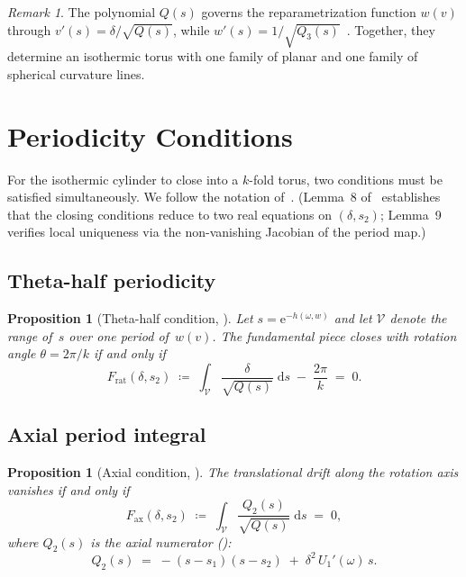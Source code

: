 \documentclass[11pt,a4paper]{article}
\theoremstyle{plain}
\newtheorem{proposition}[theorem]{Proposition}
\theoremstyle{definition}
\theoremstyle{remark}
\newtheorem{remark}[theorem]{Remark}
\newcommand{\dd}{\mathrm{d}}
\newcommand{\ee}{\mathrm{e}}
\begin{document}
\begin{remark}
  The polynomial $Q(s)$ governs the reparametrization function
  $w(v)$ through $v'(s) = \delta/\sqrt{Q(s)}$, while
  $w'(s) = 1/\sqrt{Q_3(s)}$~\cite[Corollary~6]{BHS-comp}.
  Together, they determine an isothermic torus with one family of
  planar and one family of spherical curvature lines.
\end{remark}


\section{Periodicity Conditions}\label{sec:periodicity}

For the isothermic cylinder to close into a $k$-fold torus, two
conditions must be satisfied simultaneously.  We follow the notation
of~\cite[Section~5.3]{BHS-comp}.
(Lemma~8 of~\cite{BHS-comp} establishes that the closing conditions
reduce to two real equations on $(\delta, s_2)$;
Lemma~9 verifies local uniqueness via the non-vanishing
Jacobian of the period map.)

\subsection{Theta-half periodicity}\label{sec:theta-half}

\begin{proposition}[Theta-half condition,
  {\cite[Eq.~82]{BHS-comp}}]
\label{prop:theta-half}
Let $s = \ee^{-h(\omega,w)}$ and let $\mathcal{V}$ denote the range
of~$s$ over one period of~$w(v)$.  The fundamental piece closes with
rotation angle $\theta = 2\pi/k$ if and only if
\begin{equation}
  F_{\mathrm{rat}}(\delta,s_2)
  \;\coloneqq\;
  \int_{\mathcal{V}} \frac{\delta}{\sqrt{Q(s)}} \;\dd s
  \;-\; \frac{2\pi}{k}
  \;=\; 0.
  \label{eq:F-rat}
\end{equation}
\end{proposition}

\subsection{Axial period integral}\label{sec:axial}

\begin{proposition}[Axial condition,
  {\cite[Eq.~83]{BHS-comp}}]
\label{prop:axial}
The translational drift along the rotation axis vanishes if and only if
\begin{equation}
  F_{\mathrm{ax}}(\delta,s_2)
  \;\coloneqq\;
  \int_{\mathcal{V}}
    \frac{Q_2(s)}{\sqrt{Q(s)}} \;\dd s
  \;=\; 0,
  \label{eq:F-ax}
\end{equation}
where $Q_2(s)$ is the axial numerator
(\cite[Eq.~86]{BHS-comp}):
\begin{equation}
  Q_2(s) \;=\; -(s - s_1)(s - s_2)
    \;+\; \delta^2\,U_1'(\omega)\,s.
  \label{eq:Q2}
\end{equation}
\end{proposition}
\end{document}
